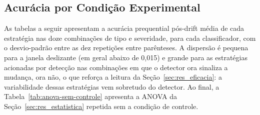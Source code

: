 \begin{apendicesenv}

\partapendices

\chapter{Acurácia por Condição Experimental}
\label{ap:tabelas}

As tabelas a seguir apresentam a acurácia prequential pós-drift média de
cada estratégia nas doze combinações de tipo e severidade, para cada
classificador, com o desvio-padrão entre as dez repetições entre
parênteses. A dispersão é pequena para a janela deslizante (em geral abaixo
de 0,015) e grande para as estratégias acionadas por detecção nas
combinações em que o detector ora sinaliza a mudança, ora não, o que
reforça a leitura da Seção~\ref{sec:res_eficacia}: a variabilidade dessas
estratégias vem sobretudo do detector. Ao final, a
Tabela~\ref{tab:anova-sem-controle} apresenta a ANOVA da
Seção~\ref{sec:res_estatistica} repetida sem a condição de controle.






\end{apendicesenv}
